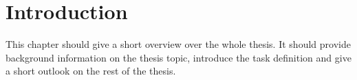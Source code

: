 \chapter{Introduction}

This chapter should give a short overview over the whole thesis. It should provide background information on the thesis topic, introduce the task definition and give a short outlook on the rest of the thesis. 
